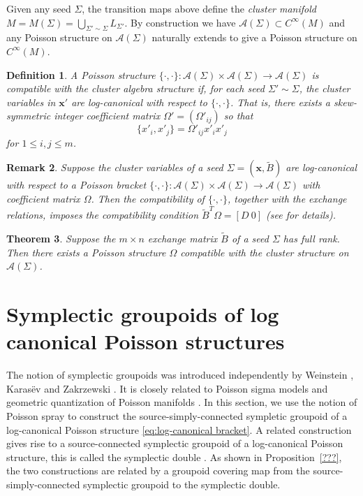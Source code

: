 \documentclass{amsart}
\newtheorem{theorem}{Theorem}[section]
\newtheorem{definition}[theorem]{Definition}
\newtheorem{remark}[theorem]{Remark}
\newcommand{\bfx}{\mathbf{x}}
\newcommand{\cA}{\mathcal{A}}
\begin{document}
Given any seed $\Sigma$, the transition maps above define the \emph{cluster manifold} $M=M(\Sigma)=\bigcup\limits_{\Sigma'\sim\Sigma}L_{\Sigma'}$.
By construction we have $\cA(\Sigma)\subset C^\infty(M)$ and any Poisson structure on $\cA(\Sigma)$ naturally extends to give a Poisson structure on $C^\infty(M)$.

\begin{definition}
  A Poisson structure $\{\cdot,\cdot\}:\cA(\Sigma)\times\cA(\Sigma)\to\cA(\Sigma)$ is \emph{compatible} with the cluster algebra structure if, for each seed $\Sigma'\sim\Sigma$, the cluster variables in $\bfx'$ are \emph{log-canonical} with respect to $\{\cdot,\cdot\}$.
  That is, there exists a skew-symmetric integer \emph{coefficient matrix} $\Omega'=(\Omega'_{ij})$ so that 
  \begin{equation}
    \label{eq:log-canonical bracket}
    \{x'_i,x'_j\}=\Omega'_{ij}x'_ix'_j
  \end{equation}
  for $1\le i,j\le m$.
\end{definition}
\begin{remark}
  Suppose the cluster variables of a seed $\Sigma=(\bfx,\tilde B)$ are log-canonical with respect to a Poisson bracket $\{\cdot,\cdot\}:\cA(\Sigma)\times\cA(\Sigma)\to\cA(\Sigma)$ with coefficient matrix $\Omega$.
  Then the compatibility of $\{\cdot,\cdot\}$, together with the exchange relations, imposes the compatibility condition $\tilde B^T\Omega=[D\ 0]$ (see \cite{berenstein-zelevinsky,gekhtman-shapiro-vainshtein} for details).
\end{remark}

\begin{theorem}
  \cite{gekhtman-shapiro-vainshtein}
  Suppose the $m\times n$ exchange matrix $\tilde B$ of a seed $\Sigma$ has full rank.  Then there exists a Poisson structure $\Omega$ compatible with the cluster structure on $\cA(\Sigma)$.
\end{theorem}


\section{Symplectic groupoids of log canonical Poisson structures}

The notion of symplectic groupoids was introduced independently by Weinstein \cite{MR866024}, Karas\"{e}v \cite{MR1008479} and Zakrzewski \cite{MR1081010, MR1081011}.
It is closely related to Poisson sigma models \cite{MR1938552} and geometric quantization of Poisson manifolds \cite{MR2417440, MR2925830}.
In this section, we use the notion of Poisson spray \cite{MR2900786} to construct the source-simply-connected sympletic groupoid of a log-canonical Poisson structure \eqref{eq:log-canonical bracket}.
A related construction gives rise to a source-connected symplectic groupoid of a log-canonical Poisson structure, this is called the symplectic double \cite{MR2470108}.
As shown in Proposition~\ref{???}, the two constructions are related by a groupoid covering map from the source-simply-connected symplectic groupoid to the symplectic double.
\end{document}
